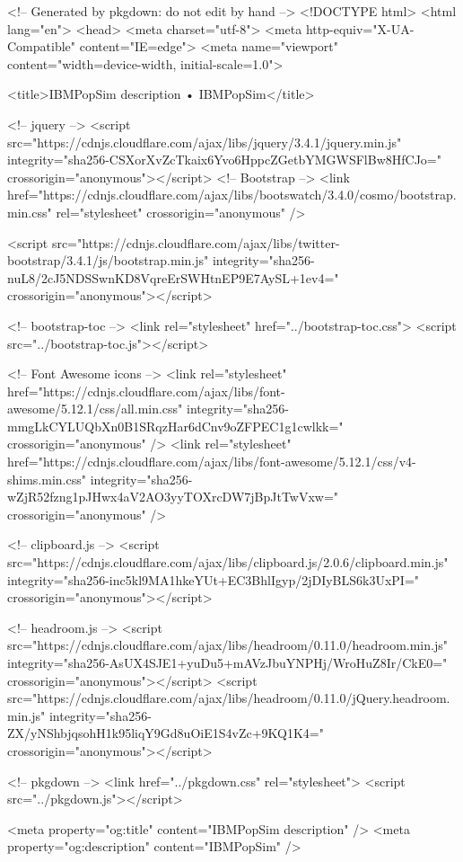 <!-- Generated by pkgdown: do not edit by hand -->
<!DOCTYPE html>
<html lang="en">
  <head>
  <meta charset="utf-8">
<meta http-equiv="X-UA-Compatible" content="IE=edge">
<meta name="viewport" content="width=device-width, initial-scale=1.0">

<title>IBMPopSim description • IBMPopSim</title>


<!-- jquery -->
<script src="https://cdnjs.cloudflare.com/ajax/libs/jquery/3.4.1/jquery.min.js" integrity="sha256-CSXorXvZcTkaix6Yvo6HppcZGetbYMGWSFlBw8HfCJo=" crossorigin="anonymous"></script>
<!-- Bootstrap -->
<link href="https://cdnjs.cloudflare.com/ajax/libs/bootswatch/3.4.0/cosmo/bootstrap.min.css" rel="stylesheet" crossorigin="anonymous" />


<script src="https://cdnjs.cloudflare.com/ajax/libs/twitter-bootstrap/3.4.1/js/bootstrap.min.js" integrity="sha256-nuL8/2cJ5NDSSwnKD8VqreErSWHtnEP9E7AySL+1ev4=" crossorigin="anonymous"></script>

<!-- bootstrap-toc -->
<link rel="stylesheet" href="../bootstrap-toc.css">
<script src="../bootstrap-toc.js"></script>

<!-- Font Awesome icons -->
<link rel="stylesheet" href="https://cdnjs.cloudflare.com/ajax/libs/font-awesome/5.12.1/css/all.min.css" integrity="sha256-mmgLkCYLUQbXn0B1SRqzHar6dCnv9oZFPEC1g1cwlkk=" crossorigin="anonymous" />
<link rel="stylesheet" href="https://cdnjs.cloudflare.com/ajax/libs/font-awesome/5.12.1/css/v4-shims.min.css" integrity="sha256-wZjR52fzng1pJHwx4aV2AO3yyTOXrcDW7jBpJtTwVxw=" crossorigin="anonymous" />

<!-- clipboard.js -->
<script src="https://cdnjs.cloudflare.com/ajax/libs/clipboard.js/2.0.6/clipboard.min.js" integrity="sha256-inc5kl9MA1hkeYUt+EC3BhlIgyp/2jDIyBLS6k3UxPI=" crossorigin="anonymous"></script>

<!-- headroom.js -->
<script src="https://cdnjs.cloudflare.com/ajax/libs/headroom/0.11.0/headroom.min.js" integrity="sha256-AsUX4SJE1+yuDu5+mAVzJbuYNPHj/WroHuZ8Ir/CkE0=" crossorigin="anonymous"></script>
<script src="https://cdnjs.cloudflare.com/ajax/libs/headroom/0.11.0/jQuery.headroom.min.js" integrity="sha256-ZX/yNShbjqsohH1k95liqY9Gd8uOiE1S4vZc+9KQ1K4=" crossorigin="anonymous"></script>

<!-- pkgdown -->
<link href="../pkgdown.css" rel="stylesheet">
<script src="../pkgdown.js"></script>




<meta property="og:title" content="IBMPopSim description" />
<meta property="og:description" content="IBMPopSim" />




